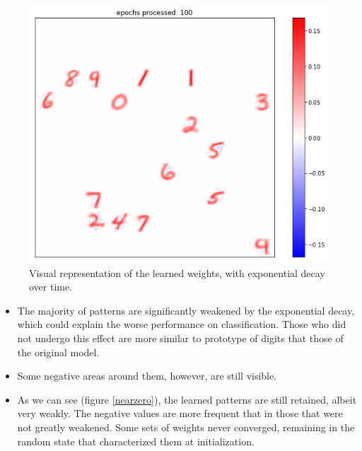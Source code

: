 \documentclass[a4paper]{report}
\begin{document}
\begin{figure} [H]
\centering
\includegraphics [width=12cm ] {h/cento.png}
\caption{Visual representation of the learned weights, with exponential decay over time.}
\label{decay}
\end{figure}

\begin{itemize}
    \item The majority of patterns are significantly weakened by the exponential decay, which could explain the worse performance on classification. Those who did not undergo this effect are more similar to prototype of digits that those of the original model.
    \item Some negative areas around them, however, are still visible.
    \item As we can see (figure \ref{nearzero}), the learned patterns are still retained, albeit very weakly. The negative values are more frequent that in those that were not greatly weakened. Some sets of weights never converged, remaining in the random state that characterized them at initialization.
\end{itemize}
\end{document}
